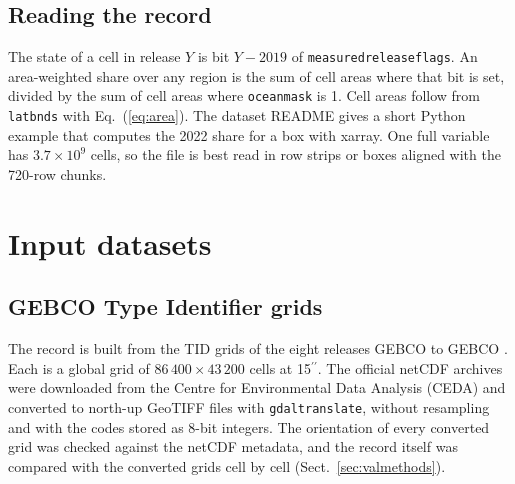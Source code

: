 \documentclass[essd, manuscript]{copernicus}
\newcommand{\as}{$^{\prime\prime}$}      %
\renewcommand{\_}{\usorig\allowbreak}
\begin{document}
\subsection{Reading the record}

The state of a cell in release $Y$ is bit $Y - 2019$ of \texttt{measured\_release\_flags}.
An area-weighted share over any region is the sum of cell areas where that bit is set, divided by the sum of cell areas where \texttt{ocean\_mask} is 1.
Cell areas follow from \texttt{lat\_bnds} with Eq.~(\ref{eq:area}).
The dataset README gives a short Python example that computes the 2022 share for a box with xarray.
One full variable has $3.7 \times 10^9$ cells, so the file is best read in row strips or boxes aligned with the 720-row chunks.

\section{Input datasets}
\label{sec:inputs}

\subsection{GEBCO Type Identifier grids}

The record is built from the TID grids of the eight releases GEBCO\_2019 to GEBCO\_2026 \citep{gebco2019,gebco2020,gebco2021,gebco2022,gebco2023,gebco2024,gebco2025,gebco2026}.
Each is a global grid of $86\,400 \times 43\,200$ cells at 15\as.
The official netCDF archives were downloaded from the Centre for Environmental Data Analysis (CEDA) and converted to north-up GeoTIFF files with \texttt{gdal\_translate}, without resampling and with the codes stored as 8-bit integers.
The orientation of every converted grid was checked against the netCDF metadata, and the record itself was compared with the converted grids cell by cell (Sect.~\ref{sec:valmethods}).
\end{document}
